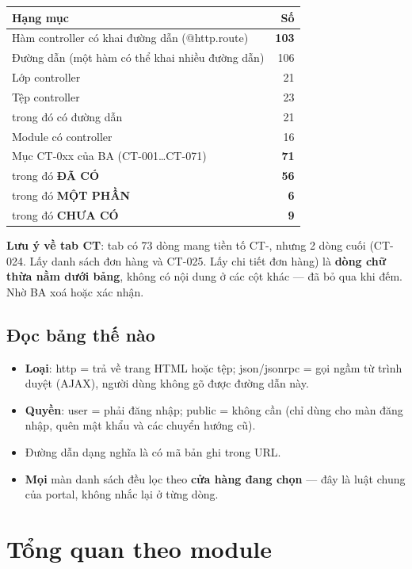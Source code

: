 \documentclass[11pt,a4paper]{report}
\newcommand{\ok}{\textcolor{okc}{\textbf{ĐÃ CÓ}}}
\newcommand{\pt}{\textcolor{partc}{\textbf{MỘT PHẦN}}}
\newcommand{\no}{\textcolor{noc}{\textbf{CHƯA CÓ}}}
\newcommand{\rt}[1]{{\ttfamily\footnotesize #1}}
\begin{document}
\begin{center}
\begin{tabular}{lr}
\toprule
\textbf{Hạng mục} & \textbf{Số} \\
\midrule
Hàm controller có khai đường dẫn (\rt{@http.route}) & \textbf{103} \\
Đường dẫn (một hàm có thể khai nhiều đường dẫn) & 106 \\
Lớp controller & 21 \\
Tệp controller & 23 \\
\quad trong đó có đường dẫn & 21 \\
Module có controller & 16 \\
\midrule
Mục CT-0xx của BA (CT-001…CT-071) & \textbf{71} \\
\quad trong đó \ok & \textbf{56} \\
\quad trong đó \pt & \textbf{6} \\
\quad trong đó \no & \textbf{9} \\
\bottomrule
\end{tabular}
\end{center}

\textbf{Lưu ý về tab CT}: tab có 73 dòng mang tiền tố \rt{CT-}, nhưng 2 dòng cuối
(\rt{CT-024. Lấy danh sách đơn hàng} và \rt{CT-025. Lấy chi tiết đơn hàng}) là
\textbf{dòng chữ thừa nằm dưới bảng}, không có nội dung ở các cột khác — đã bỏ qua khi đếm.
Nhờ BA xoá hoặc xác nhận.

\section{Đọc bảng thế nào}

\begin{itemize}[leftmargin=*]
  \item \textbf{Loại}: \rt{http} = trả về trang HTML hoặc tệp; \rt{json}/\rt{jsonrpc} = gọi
        ngầm từ trình duyệt (AJAX), người dùng không gõ được đường dẫn này.
  \item \textbf{Quyền}: \rt{user} = phải đăng nhập; \rt{public} = không cần (chỉ dùng cho màn
        đăng nhập, quên mật khẩu và các chuyển hướng cũ).
  \item Đường dẫn dạng \rt{<int:id>} nghĩa là có mã bản ghi trong URL.
  \item \textbf{Mọi} màn danh sách đều lọc theo \textbf{cửa hàng đang chọn} — đây là luật
        chung của portal, không nhắc lại ở từng dòng.
\end{itemize}

\chapter{Tổng quan theo module}
\end{document}
